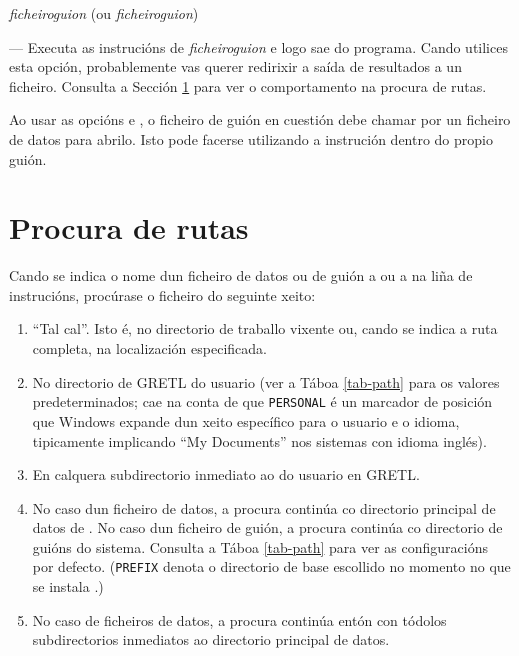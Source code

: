  \textsl{ficheiroguion} (ou 
\textsl{ficheiroguion})

--- Executa as instrucións de \textsl{ficheiroguion} e logo sae do programa.
Cando utilices esta opción, probablemente vas querer redirixir a saída de
resultados a un ficheiro. Consulta a Sección \ref{path-search} para ver o
comportamento na procura de rutas.

Ao usar as opcións  e , o ficheiro de guión en cuestión
debe chamar por un ficheiro de datos para abrilo. Isto pode facerse utilizando
a instrución  dentro do propio guión.
      
\section{Procura de rutas}
\label{path-search}

Cando se indica o nome dun ficheiro de datos ou de guión a  ou
a  na liña de instrucións, procúrase o ficheiro do seguinte
xeito:

\begin{enumerate}
\item ``Tal cal''.  Isto é, no directorio de traballo vixente ou, cando
  se indica a ruta completa, na localización especificada.
\item No directorio de GRETL do usuario (ver a Táboa \ref{tab-path} para os
  valores predeterminados; cae na conta de que \texttt{PERSONAL} é un marcador
  de posición que Windows expande dun xeito específico para o usuario e o
  idioma, tipicamente implicando ``My Documents'' nos sistemas con idioma inglés).
\item En calquera subdirectorio inmediato ao do usuario en GRETL.
\item No caso dun ficheiro de datos, a procura continúa co directorio principal
  de datos de . No caso dun ficheiro de guión, a procura continúa
  co directorio de guións do sistema. Consulta a Táboa \ref{tab-path} para ver
  as configuracións por defecto. (\texttt{PREFIX} denota o directorio de base
  escollido no momento no que se instala .)
\item No caso de ficheiros de datos, a procura continúa entón con tódolos
  subdirectorios inmediatos ao directorio principal de datos.
\end{enumerate}

